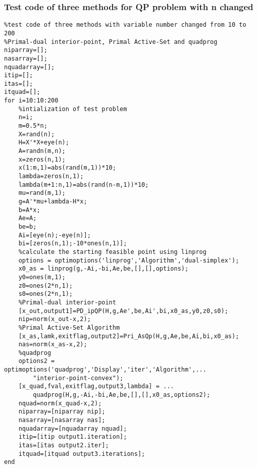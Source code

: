 \subsubsection{\bfseries Test code of three methods for QP problem with n changed}
\label{6.2.6}
{\setmainfont{Courier New Bold} \scriptsize         
\begin{lstlisting}
%test code of three methods with variable number changed from 10 to 200
%Primal-dual interior-point, Primal Active-Set and quadprog 
niparray=[];
nasarray=[];
nquadarray=[];
itip=[];
itas=[];
itquad=[];
for i=10:10:200
    %intialization of test problem
    n=i;
    m=0.5*n;
    X=rand(n);
    H=X'*X+eye(n);
    A=randn(m,n);
    x=zeros(n,1);
    x(1:m,1)=abs(rand(m,1))*10;
    lambda=zeros(n,1);
    lambda(m+1:n,1)=abs(rand(n-m,1))*10;
    mu=rand(m,1);
    g=A'*mu+lambda-H*x;
    b=A*x;
    Ae=A;
    be=b;
    Ai=[eye(n);-eye(n)];
    bi=[zeros(n,1);-10*ones(n,1)];
    %calculate the starting feasible point using linprog
    options = optimoptions('linprog','Algorithm','dual-simplex');
    x0_as = linprog(g,-Ai,-bi,Ae,be,[],[],options);
    y0=ones(m,1);
    z0=ones(2*n,1);
    s0=ones(2*n,1);
    %Primal-dual interior-point
    [x_out,output1]=PD_ipQP(H,g,Ae',be,Ai',bi,x0_as,y0,z0,s0);
    nip=norm(x_out-x,2);
    %Primal Active-Set Algorithm
    [x_as,lamk,exitflag,output2]=Pri_AsQp(H,g,Ae,be,Ai,bi,x0_as);
    nas=norm(x_as-x,2);
    %quadprog 
    options2 = optimoptions('quadprog','Display','iter','Algorithm',...
        "interior-point-convex");
    [x_quad,fval,exitflag,output3,lambda] = ...
        quadprog(H,g,-Ai,-bi,Ae,be,[],[],x0_as,options2);
    nquad=norm(x_quad-x,2);
    niparray=[niparray nip];
    nasarray=[nasarray nas];
    nquadarray=[nquadarray nquad];
    itip=[itip output1.iteration];
    itas=[itas output2.iter];
    itquad=[itquad output3.iterations];
end
\end{lstlisting}}

